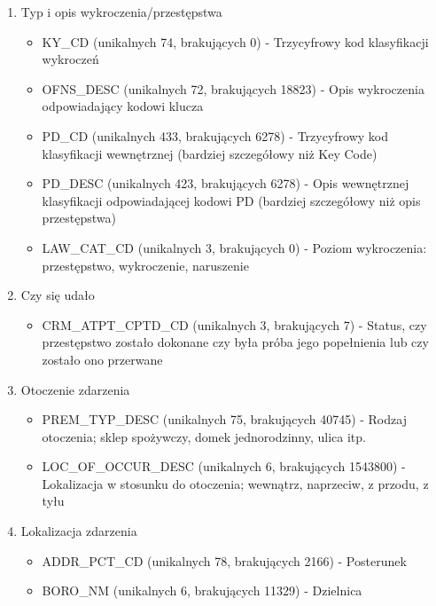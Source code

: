 \documentclass{classrep}
\begin{document}
{{\begin{enumerate}
\begin{itemize}
                \end{itemize}
                \item Typ i opis wykroczenia/przestępstwa
                \begin{itemize}
                    \item KY\_CD (unikalnych 74, brakujących 0) - Trzycyfrowy kod klasyfikacji wykroczeń
                    \item OFNS\_DESC (unikalnych 72, brakujących 18823) - Opis wykroczenia odpowiadający kodowi klucza
                    \item PD\_CD (unikalnych 433, brakujących 6278) - Trzycyfrowy kod klasyfikacji wewnętrznej (bardziej szczegółowy niż Key Code)
                    \item PD\_DESC (unikalnych 423, brakujących 6278) - Opis wewnętrznej klasyfikacji odpowiadającej kodowi PD (bardziej szczegółowy niż opis przestępstwa)
                    \item LAW\_CAT\_CD (unikalnych 3, brakujących 0) - Poziom wykroczenia: przestępstwo, wykroczenie, naruszenie
                \end{itemize}
                \item Czy się udało
                \begin{itemize}
                    \item CRM\_ATPT\_CPTD\_CD (unikalnych 3, brakujących 7) - Status, czy przestępstwo zostało dokonane czy była próba jego popełnienia lub czy zostało ono przerwane
                \end{itemize}
                \item Otoczenie zdarzenia
                \begin{itemize}
                    \item PREM\_TYP\_DESC (unikalnych 75, brakujących 40745) - Rodzaj otoczenia; sklep spożywczy, domek jednorodzinny, ulica itp.
                    \item LOC\_OF\_OCCUR\_DESC (unikalnych 6, brakujących 1543800) - Lokalizacja w stosunku do otoczenia; wewnątrz, naprzeciw, z przodu, z tyłu
                \end{itemize}
                \item Lokalizacja zdarzenia
                \begin{itemize}
                    \item ADDR\_PCT\_CD (unikalnych 78, brakujących 2166) - Posterunek
                    \item BORO\_NM (unikalnych 6, brakujących 11329) - Dzielnica

\end{itemize}
\end{enumerate}}}
\end{document}

